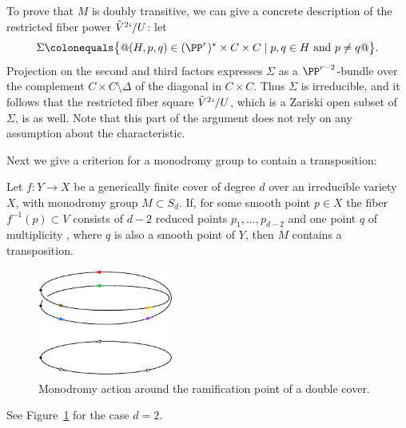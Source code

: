 To prove that $M$ is doubly transitive, we can give a concrete description
\vadjust{\allowbreak}%
of the restricted fiber power $\tilde V^2`/U$: let
%
$$
\Sigma \colonequals  \bigl\{@ (H, p, q) \in (\PP^r)^* \times C \times C
\mid p, q \in H \text{ and } p \neq q @\bigr\}.
$$
Projection on the second and third factors expresses $\Sigma$ as a
$\PP^{r-2}$-bundle over the complement $C \times C \setminus \Delta$
of the diagonal in $C \times C$. Thus $\Sigma$ is irreducible, and it
follows that the restricted fiber square $\tilde V^2`/U$, which is a
Zariski open subset of $\Sigma$, is as well. Note that this part of the
argument does not rely on any assumption about the characteristic.

Next we give a criterion for a monodromy group to contain a transposition:

\begin{lemma}\label{transposition lemma}
Let $f : Y \to X$ be a generically finite cover of degree $d$ over an
%
irreducible variety $X$, with  monodromy group $M \subset S_d$.
If,  for some smooth point $p \in X$ the fiber $f^{-1}(p)\subset V$
consists of $d-2$ reduced points $p_1,\dots, p_{d-2}$ and one point $q$
of multiplicity \2, where $q$ is also a smooth point of $Y$, then $M$
contains a transposition.
\end{lemma}

\begin{figure}
\centerline {\includegraphics[height=1.4in]{main/Fig10-1}}
\vskip-5pt
\caption{Monodromy action around the ramification point of a double cover.}
\label{$d=2$ monodromy}
\end{figure}

See Figure~\ref{$d=2$ monodromy} for the case $d=2$.


